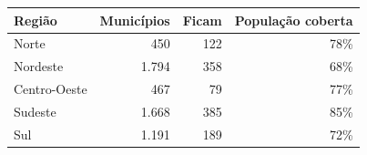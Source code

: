 \begin{tabular}{@{}lrrr@{}}
\toprule
\textbf{Região} & \textbf{Municípios} & \textbf{Ficam} & \textbf{População coberta}\\
\midrule
Norte & 450 & 122 & 78\%\\
Nordeste & 1.794 & 358 & 68\%\\
Centro-Oeste & 467 & 79 & 77\%\\
Sudeste & 1.668 & 385 & 85\%\\
Sul & 1.191 & 189 & 72\%\\
\bottomrule
\end{tabular}
